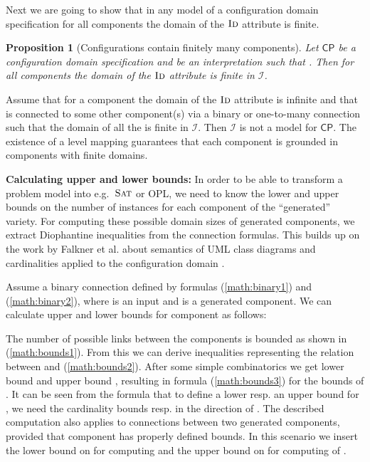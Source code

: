\documentclass[copyright,creativecommons]{eptcs}
\newcommand{\SAT}{\ensuremath{\text{\sc Sat}}\xspace}
\newcommand{\confprob}{\ensuremath{\mathsf{CP}}\xspace}
\newcommand{\sort}[1]{\ensuremath{\text{\sc #1}}\xspace}
\newcommand{\interpretation}{\ensuremath{\mathcal{I}}\xspace}
\newtheorem{proposition}{Proposition}
\begin{document}
Next we are going to show that in any model of a configuration domain specification for all components the domain of the \sort{Id} attribute is finite.

\begin{proposition}[Configurations contain finitely many components]
Let \confprob be a configuration domain specification and  be an interpretation such that . Then for all components 
the domain of the \sort{Id} attribute is finite in \interpretation.
\end{proposition}

Assume that for a component  the domain of the \sort{Id} attribute is infinite and that  is connected to some other component(s)  via a binary or one-to-many connection
such that the domain of all the  is finite in \interpretation. Then \interpretation is not a model for \confprob. The existence of a level mapping guarantees that each component
is grounded in components with finite domains.


{\noindent \bf Calculating upper and lower bounds\/:} 
In order to be able to transform a problem model into e.g.\ \SAT or OPL, we need to know the lower and upper bounds on the number of instances for each component of the ``generated'' variety. 
For computing these possible domain sizes of generated components, we extract Diophantine inequalities from the connection formulas.  
This builds up on the work by Falkner et al. about semantics of UML class diagrams and cardinalities applied to the configuration domain \cite{falkner:uml2}. 

Assume a binary connection defined by formulas (\ref{math:binary1}) and (\ref{math:binary2}), where  is an input and  is a generated component. We can calculate upper and lower bounds 
for component  as follows\/:



The number of possible links  between the components is bounded as shown in (\ref{math:bounds1}). 
From this we can derive inequalities representing the relation between  and  (\ref{math:bounds2}). 
After some simple combinatorics we get lower bound  and 
upper bound , resulting in formula (\ref{math:bounds3}) for the bounds of . It can be seen from the formula that to define a lower resp. an upper bound for , we need the cardinality bounds  resp.  in the direction of . 
The described computation also applies to connections between two generated components, provided that component  has properly defined bounds. 
In this scenario we insert the lower bound on  for computing  and the upper bound on  for computing  of . 
\end{document}
